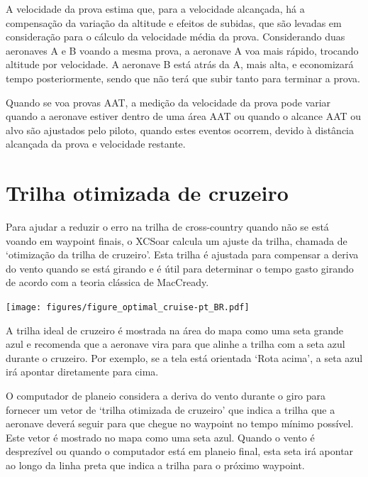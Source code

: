 A velocidade da prova estima que, para a velocidade alcançada, há a compensação da variação da altitude e efeitos de subidas, que são levadas em consideração para o cálculo da velocidade média da prova.  Considerando duas aeronaves A e B voando a mesma prova, a aeronave A voa mais rápido, trocando altitude por velocidade.  A aeronave B está atrás da A, mais alta, e economizará tempo posteriormente, sendo que não terá que subir tanto para terminar a prova.

Quando se voa provas AAT, a medição da velocidade da prova pode variar quando a aeronave estiver dentro de uma área AAT ou quando o alcance AAT ou alvo são ajustados pelo piloto, quando estes eventos ocorrem, devido à distância alcançada da prova e velocidade restante.


\section{Trilha otimizada de cruzeiro}

Para ajudar a reduzir o erro na trilha de cross-country quando não se está voando em waypoint finais, o XCSoar calcula um ajuste da trilha, chamada de ‘otimização da trilha de cruzeiro’.    Esta trilha é ajustada para compensar a deriva do vento quando se está girando e é útil para determinar o tempo gasto girando de acordo com a teoria clássica de MacCready.

\begin{center}
\begin{maxipage}
\centering
\def\svgwidth{0.8\linewidth}
\texttt{[image: figures/figure\_optimal\_cruise-pt\_BR.pdf]}
\end{maxipage}
\end{center}

A trilha ideal de cruzeiro é mostrada na área do mapa como uma seta grande azul e recomenda que a aeronave vira para que alinhe a trilha com a seta azul durante o cruzeiro.  Por exemplo, se a tela está orientada ‘Rota acima’, a seta azul irá apontar diretamente para cima.

O computador de planeio considera a deriva do vento durante o giro para fornecer um vetor de ‘trilha otimizada de cruzeiro’ que indica a trilha que a aeronave deverá seguir para que chegue no waypoint no tempo mínimo possível.  Este vetor é mostrado no mapa como uma seta azul.  Quando o vento é desprezível ou quando o computador está em planeio final, esta seta irá apontar ao longo da linha preta que indica a trilha para o próximo waypoint.

